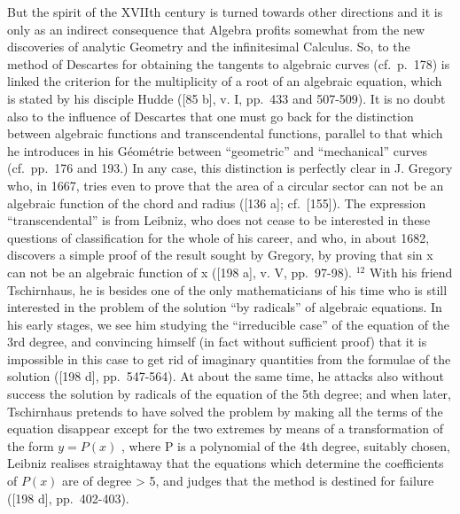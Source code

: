 But the spirit of the XVIIth century is turned towards other directions and it is only as an indirect consequence that Algebra profits somewhat from the new discoveries of analytic Geometry and the infinitesimal Calculus. So, to the method of Descartes for obtaining the tangents to algebraic curves (cf.~p.~178) is linked the criterion for the multiplicity of a root of an algebraic equation, which is stated by his disciple Hudde ({[}85 b{]}, v. I, pp.~433 and 507-509). It is no doubt also to the influence of Descartes that one must go back for the distinction between algebraic functions and transcendental functions, parallel to that which he introduces in his Géométrie between ``geometric'' and ``mechanical'' curves (cf.~pp.~176 and 193.) In any case, this distinction is perfectly clear in J. Gregory who, in 1667, tries even to prove that the area of a circular sector can not be an algebraic function of the chord and radius ({[}136 a{]}; cf.~{[}155{]}). The expression ``transcendental'' is from Leibniz, who does not cease to be interested in these questions of classification for the whole of his career, and who, in about 1682, discovers a simple proof of the result sought by Gregory, by proving that sin x can not be an algebraic function of x ({[}198 a{]}, v. V, pp.~97-98). \(^{12}\) With his friend Tschirnhaus, he is besides one of the only mathematicians of his time who is still interested in the problem of the solution ``by radicals'' of algebraic equations. In his early stages, we see him studying the ``irreducible case'' of the equation of the 3rd degree, and convincing himself (in fact without sufficient proof) that it is impossible in this case to get rid of imaginary quantities from the formulae of the solution ({[}198 d{]}, pp.~547-564). At about the same time, he attacks also without success the solution by radicals of the equation of the 5th degree; and when later, Tschirnhaus pretends to have solved the problem by making all the terms of the equation disappear except for the two extremes by means of a transformation of the form \(y = P(x)\) , where P is a polynomial of the 4th degree, suitably chosen, Leibniz realises straightaway that the equations which determine the coefficients of \(P(x)\) are of degree \textgreater{} 5, and judges that the method is destined for failure ({[}198 d{]}, pp.~402-403).

